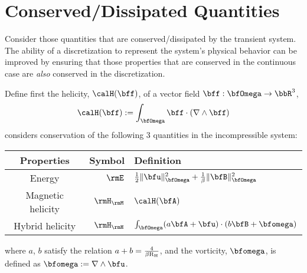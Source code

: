 \section{Conserved/Dissipated Quantities}
    
    Consider those quantities that are conserved/dissipated by the transient system. The ability of a discretization to represent the system's physical behavior can be improved by ensuring that those properties that are conserved in the continuous case are \emph{also} conserved in the discretization. \BA{[Ref, ...]}

    Define first the helicity, $\calH(\bff)$, of a vector field $\bff : \bfOmega \rightarrow \bbR^{3}$,
    \begin{equation}
        \calH(\bff)  :=  \int_{\bfOmega}\bff\cdot(\nabla\wedge\bff)
    \end{equation}
    \cite{LHF22} considers conservation of the following 3 quantities in the incompressible system: 
    \begin{center}\begin{tabular}{ c | r l }
        Properties  &  Symbol  &  Definition  \\
        \hline\hline
        Energy  &  $\rmE$  &  $\frac{1}{2}\|\bfu\|_{\bfOmega}^{2} + \frac{1}{\beta}\|\bfB\|_{\bfOmega}^{2}$  \\
        Magnetic helicity  &  $\rmH_{\rmM}$  &  $\calH(\bfA)$  \\
        Hybrid helicity  &  $\rmH_{\rmH}$  &  $\int_{\bfOmega}(a\bfA + \bfu)\cdot(b\bfB + \bfomega)$
    \end{tabular}\end{center}
    where $a$, $b$ satisfy the relation $a + b  =  \frac{4}{\beta\mathrm{R}_{\mathrm{H}}}$,  and the vorticity, $\bfomega$, is defined as $\bfomega  :=  \nabla\wedge\bfu$.
    
